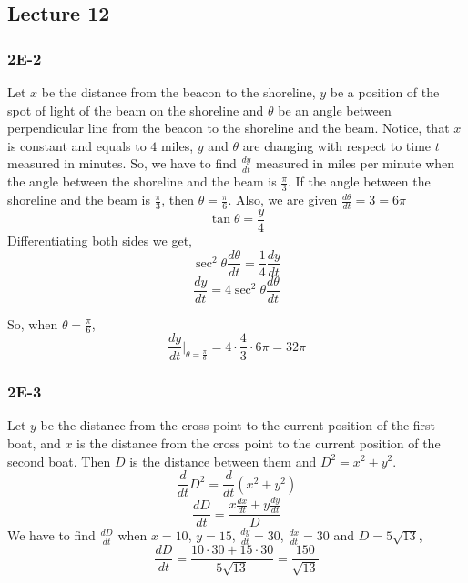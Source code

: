 \documentclass{article}
\begin{document}
\subsection{Lecture 12}
\subsubsection{2E-2}
\begin{figure}[htp!]
    \centering
    
    \label{fig:fig3}
\end{figure}

Let $x$ be the distance from the beacon to the shoreline, $y$ be a position of the spot of light of the beam on the shoreline and $\theta$ be an angle between perpendicular line from the beacon to the shoreline and the beam. Notice, that $x$ is constant and equals to $4$ miles, $y$ and $\theta$ are changing with respect to time $t$ measured in minutes. So, we have to find $\frac{dy}{dt}$ measured in miles per minute when the angle between the shoreline and the beam is $\frac{\pi}{3}$. If the angle between the shoreline and the beam is $\frac{\pi}{3}$, then $\theta = \frac{\pi}{6}$. Also, we are given $\frac{d\theta}{dt} = 3 = 6\pi$
\[ \tan{\theta} = \frac{y}{4} \]
Differentiating both sides we get,
\[ \sec^2{\theta} \frac{d\theta}{dt} = \frac{1}{4} \frac{dy}{dt} \]
\[ \frac{dy}{dt} = 4 \sec^2{\theta} \frac{d\theta}{dt} \]

So, when $\theta = \frac{\pi}{6}$,
\[ \frac{dy}{dt} \Big|_{\theta = \frac{\pi}{6}} = 4 \cdot \frac{4}{3} \cdot 6\pi = 32 \pi  \]

\subsubsection{2E-3}
\begin{figure}[htp!]
    \centering
    
    \label{fig:fig4}
\end{figure}
Let $y$ be the distance from the cross point to the current position of the first boat, and $x$ is the distance from the cross point to the current position of the second boat. Then $D$ is the distance between them and $D^2 = x^2+y^2$.
\[ \frac{d}{dt} D^2 = \frac{d}{dt} \left( x^2 + y^2 \right)\]
\[ \frac{dD}{dt} = \frac{x\frac{dx}{dt} + y\frac{dy}{dt}}{D} \]
We have to find $\frac{dD}{dt}$ when $x = 10$, $y = 15$, $\frac{dy}{dt} = 30$, $\frac{dx}{dt} = 30$ and $D = 5\sqrt{13}$,
\[ \frac{dD}{dt} =  \frac{10\cdot30 + 15\cdot30}{5\sqrt{13}} = \frac{150}{\sqrt{13}}\]

\newpage
\end{document}

